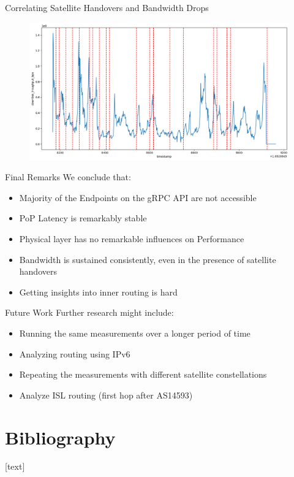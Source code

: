 \documentclass[NET,english,beameralt]{tumbeamer}
\begin{document}
\begin{frame}[fragile]{Correlating Satellite Handovers and Bandwidth Drops}
    \begin{figure}
        \includegraphics[width=0.8\columnwidth]{pics/correlation_handovers_bw.png}
    \end{figure}
\end{frame}

\begin{frame}[fragile]{Final Remarks}
    We conclude that:
    \begin{itemize}
        \item Majority of the Endpoints on the gRPC API are not accessible
        \item PoP Latency is remarkably stable
        \item Physical layer has no remarkable influences on Performance
        \item Bandwidth is sustained consistently, even in the presence of satellite handovers
        \item Getting insights into inner routing is hard
    \end{itemize}
\end{frame}

\begin{frame}[fragile]{Future Work}
    Further research might include:
    \begin{itemize}
        \item Running the same measurements over a longer period of time
        \item Analyzing routing using IPv6
        \item Repeating the measurements with different satellite constellations
        \item Analyze ISL routing (first hop after AS14593)
    \end{itemize}
\end{frame}

\section{Bibliography}
\begin{frame}[allowframebreaks]
    
    [text]
    \footnotesize
    
\end{frame}
\end{document}

